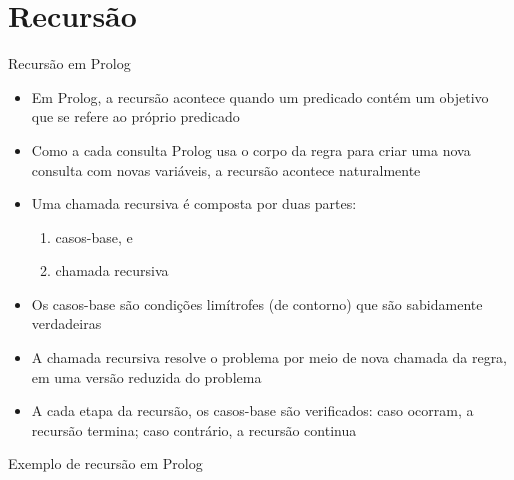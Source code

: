\section{Recursão}

\begin{frame}[fragile]{Recursão em Prolog}

    \begin{itemize}
        \item Em Prolog, a recursão acontece quando um predicado contém um objetivo que se 
            refere ao próprio predicado

        \item Como a cada consulta Prolog usa o corpo da regra para criar uma nova consulta 
            com novas variáveis, a recursão acontece naturalmente

        \item Uma chamada recursiva é composta por duas partes:

        \begin{enumerate}
            \item casos-base, e
            \item chamada recursiva
        \end{enumerate}

        \item Os casos-base são condições limítrofes (de contorno) que são sabidamente 
            verdadeiras

        \item A chamada recursiva resolve o problema por meio de nova chamada da regra, em uma
            versão reduzida do problema

        \item A cada etapa da recursão, os casos-base são verificados: caso ocorram, a recursão 
            termina; caso contrário, a recursão continua

    \end{itemize}

\end{frame}

\begin{frame}[fragile]{Exemplo de recursão em Prolog}


\end{frame}

